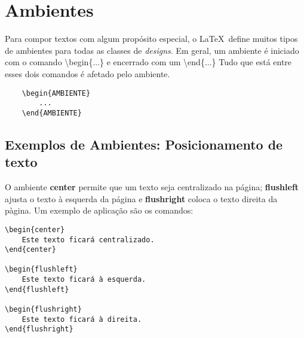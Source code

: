 \section{Ambientes}
\begin{frame}[fragile]

Para compor textos com algum propósito especial, o \LaTeX~define
muitos tipos de ambientes para todas as classes de {\it designs}.
Em geral, um ambiente é iniciado com o comando {\code\textbackslash begin\{...\}} e encerrado com
um {\code\textbackslash end\{...\}} Tudo que está entre esses dois comandos é afetado pelo
ambiente.

\vspace{0.5cm}
\begin{center}
\begin{verbatim}
    \begin{AMBIENTE}
        ...
    \end{AMBIENTE}
\end{verbatim}
\end{center}

\end{frame}

\subsection*{Exemplos de Ambientes: Posicionamento de texto} %

\begin{frame}[fragile]
O ambiente {\bf center} permite que um texto seja centralizado na página;
{\bf flushleft} ajusta o texto à esquerda da página e {\bf flushright} coloca o texto
direita da pàgina. Um exemplo de aplicação são os comandos:

\vspace{0.5cm}
\begin{CenteredBox}
\begin{lstlisting}[linewidth=6.5cm]
\begin{center}
    Este texto ficará centralizado.
\end{center}

\begin{flushleft}
    Este texto ficará à esquerda.
\end{flushleft}

\begin{flushright}
    Este texto ficará à direita.
\end{flushright}
\end{lstlisting}
\end{CenteredBox}

\end{frame}


